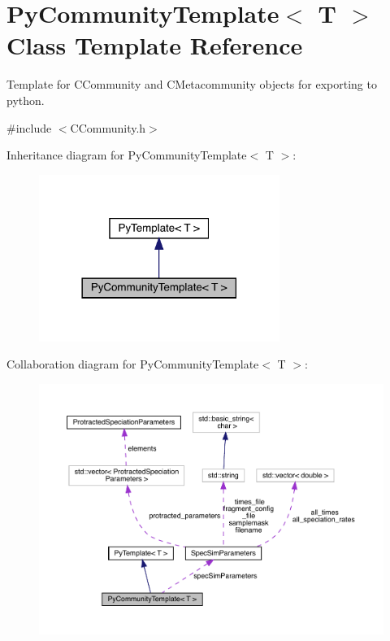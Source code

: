 \hypertarget{class_py_community_template}{}\section{Py\+Community\+Template$<$ T $>$ Class Template Reference}
\label{class_py_community_template}


Template for C\+Community and C\+Metacommunity objects for exporting to python.  




{\ttfamily \#include $<$C\+Community.\+h$>$}



Inheritance diagram for Py\+Community\+Template$<$ T $>$\+:
\nopagebreak
\begin{figure}[H]
\begin{center}
\leavevmode
\includegraphics[width=222pt]{class_py_community_template__inherit__graph}
\end{center}
\end{figure}


Collaboration diagram for Py\+Community\+Template$<$ T $>$\+:
\nopagebreak
\begin{figure}[H]
\begin{center}
\leavevmode
\includegraphics[width=350pt]{class_py_community_template__coll__graph}
\end{center}
\end{figure}
